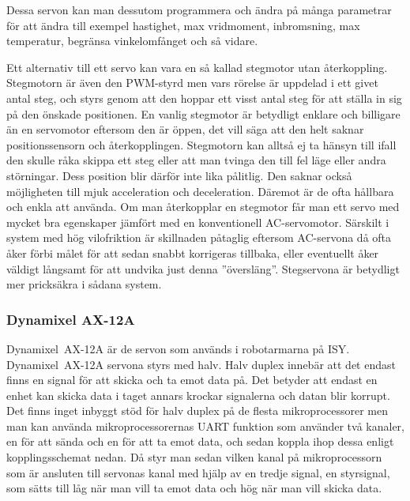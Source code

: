 \documentclass[a4paper,12pt]{article}
\begin{document}
Dessa servon kan man dessutom programmera och ändra på många parametrar för att ändra till exempel hastighet, max vridmoment, inbromsning, max temperatur, begränsa vinkelomfånget och så vidare.
 
Ett alternativ till ett servo kan vara en så kallad stegmotor utan återkoppling. Stegmotorn är även den PWM-styrd men vars rörelse är uppdelad i ett givet antal steg, och styrs genom att den hoppar ett visst antal steg för att ställa in sig på den önskade positionen. En vanlig stegmotor är betydligt enklare och billigare än en servomotor eftersom den är öppen, det vill säga att den helt saknar positionssensorn och återkopplingen. Stegmotorn kan alltså ej ta hänsyn till ifall den skulle råka skippa ett steg eller att man tvinga den till fel läge eller andra störningar. Dess position blir därför inte lika pålitlig. Den saknar också möjligheten till mjuk acceleration och deceleration. Däremot är de ofta hållbara och enkla att använda. Om man återkopplar en stegmotor får man ett servo med mycket bra egenskaper jämfört med en konventionell AC-servomotor.  Särskilt i system med hög vilofriktion är skillnaden påtaglig eftersom AC-servona då ofta åker förbi målet för att sedan snabbt korrigeras tillbaka, eller eventuellt åker väldigt långsamt för att undvika just denna ”översläng”. Stegservona är betydligt mer pricksäkra i sådana system. 
 
\subsubsection{Dynamixel AX-12A}
 
Dynamixel~AX-12A är de servon som används i robotarmarna på ISY. Dynamixel~AX-12A servona styrs med halv. Halv duplex innebär att det endast finns en signal för att skicka och ta emot data på. Det betyder att endast en enhet kan skicka data i taget annars krockar signalerna och datan blir korrupt. Det finns inget inbyggt stöd för halv duplex på de flesta mikroprocessorer men man kan använda mikroprocessorernas UART funktion som använder två kanaler, en för att sända och en för att ta emot data, och sedan koppla ihop dessa enligt kopplingsschemat nedan. Då styr man sedan vilken kanal på mikroprocessorn som är ansluten till servonas kanal med hjälp av en tredje signal, en styrsignal,  som sätts till låg när man vill ta emot data och hög när man vill skicka data. 
 
\end{document}
